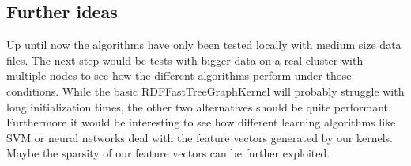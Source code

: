 \documentclass{easychair}
\begin{document}
\subsection{Further ideas}
Up until now the algorithms have only been tested locally with medium size data files. The next step would be tests with bigger data on a real cluster with multiple nodes to see how the different algorithms perform under those conditions. While the basic RDFFastTreeGraphKernel will probably struggle with long initialization times, the other two alternatives should be quite performant. Furthermore it would be interesting to see how different learning algorithms like SVM or neural networks deal with the feature vectors generated by our kernels. Maybe the sparsity of our feature vectors can be further exploited.



%
\label{sect:bib}

%
%
%



\end{document}

